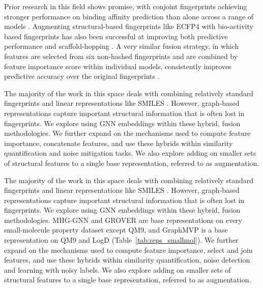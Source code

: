 Prior research in this field shows promise, with conjoint fingerprints achieving stronger performance on binding affinity prediction than alone across a range of models \citep{Xie2020}. Augmenting structural-based fingerprints like ECFP4 with bio-activity based fingerprints has also been successful at improving both predictive performance and scaffold-hopping \citep{Laufktter2019}. A very similar fusion strategy, in which features are selected from six non-hashed fingerprints and are combined by feature importance score within individual models, consistently improves predictive accuracy over the original fingerprints \citep{Turkina2025}. 

The majority of the work in this space deals with combining relatively standard fingerprints and linear representations like SMILES \citep{Xie2020, Laufktter2019}. However, graph-based representations capture important structural information that is often lost in fingerprints. We explore using GNN embeddings within these hybrid, fusion methodologies. We further expand on the mechanisms used to compute feature importance, concatenate features, and use these hybrids within similarity quantification and noise mitigation tasks. We also explore adding on smaller sets of structural features to a single base representation, referred to as augmentation. 

The majority of the work in this space deals with combining relatively standard fingerprints and linear representations like SMILES \citep{Xie2020, Laufktter2019}. However, graph-based representations capture important structural information that is often lost in fingerprints. We explore using GNN embeddings within these hybrid, fusion methodologies. MHG-GNN and GROVER are base representations on every small-molecule property dataset except QM9, and GraphMVP is a base representation on QM9 and LogD (Table~\ref{tab:reps_smallmol}). We further expand on the mechanisms used to compute feature importance, select and join features, and use these hybrids within similarity quantification, noise detection and learning with noisy labels. We also explore adding on smaller sets of structural features to a single base representation, referred to as augmentation.

